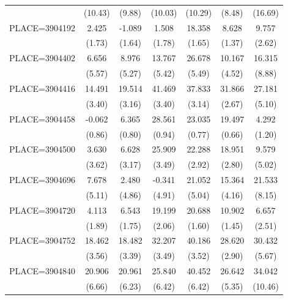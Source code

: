 {\begin{tabular}{l*{6}{c}}
                    &     (10.43)&      (9.88)&     (10.03)&     (10.29)&      (8.48)&     (16.69)\\
PLACE=3904192       &       2.425&      -1.089&       1.508&      18.358&       8.628&       9.757\\
                    &      (1.73)&      (1.64)&      (1.78)&      (1.65)&      (1.37)&      (2.62)\\
PLACE=3904402       &       6.656&       8.976&      13.767&      26.678&      10.167&      16.315\\
                    &      (5.57)&      (5.27)&      (5.42)&      (5.49)&      (4.52)&      (8.88)\\
PLACE=3904416       &      14.491&      19.514&      41.469&      37.833&      31.866&      27.181\\
                    &      (3.40)&      (3.16)&      (3.40)&      (3.14)&      (2.67)&      (5.10)\\
PLACE=3904458       &      -0.062&       6.365&      28.561&      23.035&      19.497&       4.292\\
                    &      (0.86)&      (0.80)&      (0.94)&      (0.77)&      (0.66)&      (1.20)\\
PLACE=3904500       &       3.630&       6.628&      25.909&      22.288&      18.951&       9.579\\
                    &      (3.62)&      (3.17)&      (3.49)&      (2.92)&      (2.80)&      (5.02)\\
PLACE=3904696       &       7.678&       2.480&      -0.341&      21.052&      15.364&      21.533\\
                    &      (5.11)&      (4.86)&      (4.91)&      (5.04)&      (4.16)&      (8.15)\\
PLACE=3904720       &       4.113&       6.543&      19.199&      20.688&      10.902&       6.657\\
                    &      (1.89)&      (1.75)&      (2.06)&      (1.60)&      (1.45)&      (2.51)\\
PLACE=3904752       &      18.462&      18.482&      32.207&      40.186&      28.620&      30.432\\
                    &      (3.56)&      (3.39)&      (3.49)&      (3.52)&      (2.90)&      (5.67)\\
PLACE=3904840       &      20.906&      20.961&      25.840&      40.452&      26.642&      34.042\\
                    &      (6.66)&      (6.23)&      (6.42)&      (6.42)&      (5.35)&     (10.46)\\

\end{tabular}}
